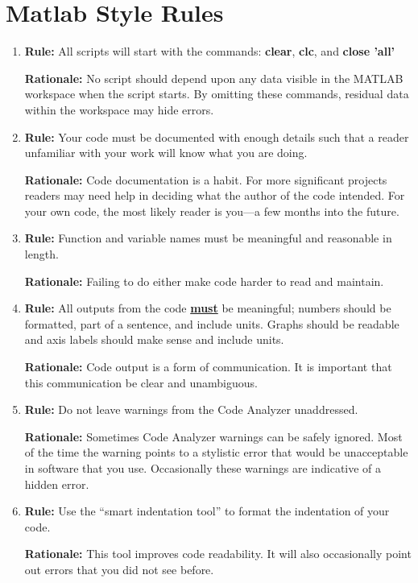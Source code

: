 \documentclass{tufte-book}
\theoremstyle{break}
\let\oldchapter\chapter
\def\chapter{%
  \setcounter{footnote}{0}%
  \oldchapter
}
\begin{document}
\chapter{Matlab Style Rules}
\begin{enumerate}
\item \textbf{Rule:} All scripts will start with the commands: \textbf{clear}, \textbf{clc}, and \textbf{close 'all'}

\textbf{Rationale:} No script should depend upon any data visible in the MATLAB workspace when the script starts.  By omitting these commands, residual data within the workspace may hide errors.

\item \textbf{Rule:} Your code must be documented with enough details such that a reader unfamiliar with your work will know what you are doing.

\textbf{Rationale:} Code documentation is a habit. For more significant projects readers may need help in deciding what the author of the code intended.  For your own code, the most likely reader is you---a few months into the future.

\item \textbf{Rule:} Function and variable names must be meaningful and reasonable in length.

\textbf{Rationale:} Failing to do either make code harder to read and maintain.

\item \textbf{Rule:} All outputs from the code \underline{\textbf{must}} be meaningful; numbers should be formatted, part of a sentence, and include units. Graphs should be readable and axis labels should make sense and include units.

\textbf{Rationale:} Code output is a form of communication. It is important that this communication be clear and unambiguous.

\item \textbf{Rule:} Do not leave warnings from the Code Analyzer unaddressed.

\textbf{Rationale:} Sometimes Code Analyzer warnings can be safely ignored.  Most of the time the warning points to a stylistic error that would be unacceptable in software that you use. Occasionally these warnings are indicative of a hidden error.

\item \textbf{Rule:} Use the ``smart indentation tool'' to format the indentation of your code.

\textbf{Rationale:} This tool improves code readability. It will also occasionally point out errors that you did not see before.


\end{enumerate}
\end{document}
